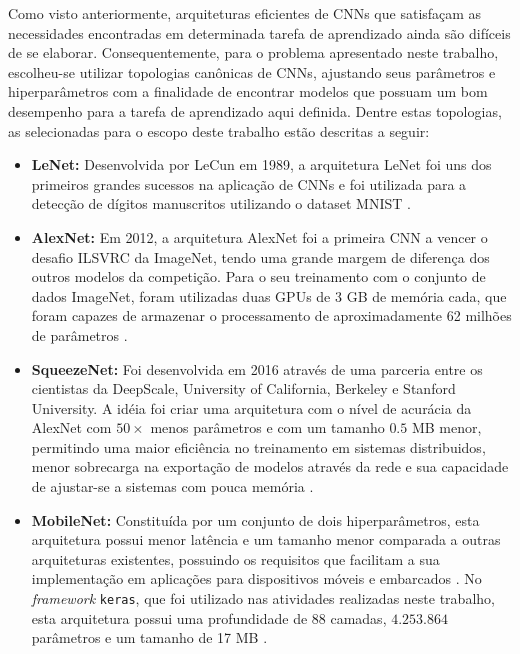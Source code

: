 
Como visto anteriormente, arquiteturas eficientes de CNNs que satisfaçam as necessidades encontradas em determinada tarefa de aprendizado ainda são difíceis de se elaborar. Consequentemente, para o problema apresentado neste trabalho, escolheu-se utilizar topologias canônicas de CNNs, ajustando seus parâmetros e hiperparâmetros com a finalidade de encontrar modelos que possuam um bom desempenho para a tarefa de aprendizado aqui definida. Dentre estas topologias, as selecionadas para o escopo deste trabalho estão descritas a seguir:

\begin{itemize}
	\item \textbf{LeNet: } Desenvolvida por LeCun em 1989, a arquitetura LeNet foi uns dos primeiros grandes sucessos na aplicação de CNNs e foi utilizada para a detecção de dígitos manuscritos utilizando o dataset MNIST \cite{lecun}.
		\item \textbf{AlexNet: } Em 2012, a arquitetura AlexNet foi a primeira CNN a vencer o desafio ILSVRC da ImageNet, tendo uma grande margem de diferença dos outros modelos da competição. Para o seu treinamento com o conjunto de dados ImageNet, foram utilizadas duas GPUs de 3 GB de memória cada, que foram capazes de armazenar o processamento de aproximadamente 62 milhões de parâmetros \cite{alexnet,khan}.
	\item \textbf{SqueezeNet: } Foi desenvolvida em 2016 através de uma parceria entre os cientistas da DeepScale, University of California, Berkeley e Stanford University. A idéia foi criar uma arquitetura com o nível de acurácia da AlexNet com $50 \times$ menos parâmetros e com um tamanho $0.5$ MB menor, permitindo uma maior eficiência no treinamento em sistemas distribuidos, menor sobrecarga na exportação de modelos através da rede e sua capacidade de ajustar-se a sistemas com pouca memória \cite{squeezenet}.
	\item \textbf{MobileNet: } Constituída por um conjunto de dois hiperparâmetros, esta arquitetura possui menor latência e um tamanho menor comparada a outras arquiteturas existentes, possuindo os requisitos que facilitam a sua implementação em aplicações para dispositivos móveis e embarcados \cite{mobilenet}. No \emph{framework} \texttt{keras}, que foi utilizado nas atividades realizadas neste trabalho, esta arquitetura possui uma profundidade de $88$ camadas, $4.253.864$ parâmetros e um tamanho de 17 MB \cite{keras}.
\end{itemize}

